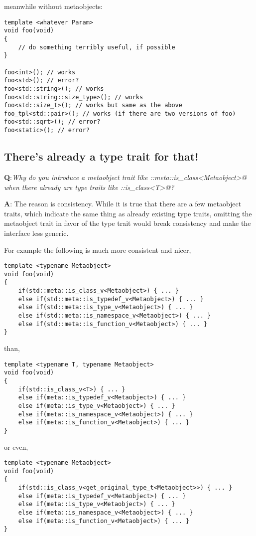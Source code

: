 meanwhile without metaobjects:

\begin{verbatim}
template <whatever Param>
void foo(void)
{
	// do something terribly useful, if possible
}

foo<int>(); // works
foo<std>(); // error?
foo<std::string>(); // works
foo<std::string::size_type>(); // works
foo<std::size_t>(); // works but same as the above
foo_tpl<std::pair>(); // works (if there are two versions of foo)
foo<std::sqrt>(); // error?
foo<static>(); // error?
\end{verbatim}

\subsection{There's already a type trait for that!}

{\textbf Q:}{\em Why do you introduce a metaobject trait like
\verb@std::meta::is_class<Metaobject>@  when there already are type traits like
\verb@std::is_class<T>@?}

{\textbf A:} The reason is consistency.
While it is true that there are a few metaobject traits, which indicate the
same thing as already existing type traits, omitting the metaobject trait
in favor of the type trait would break consistency and make the interface less generic.

For example the following is much more consistent and nicer,

\begin{verbatim}
template <typename Metaobject>
void foo(void)
{
	if(std::meta::is_class_v<Metaobject>) { ... }
	else if(std::meta::is_typedef_v<Metaobject>) { ... }
	else if(std::meta::is_type_v<Metaobject>) { ... }
	else if(std::meta::is_namespace_v<Metaobject>) { ... }
	else if(std::meta::is_function_v<Metaobject>) { ... }
}
\end{verbatim}

than,

\begin{verbatim}
template <typename T, typename Metaobject>
void foo(void)
{
	if(std::is_class_v<T>) { ... }
	else if(meta::is_typedef_v<Metaobject>) { ... }
	else if(meta::is_type_v<Metaobject>) { ... }
	else if(meta::is_namespace_v<Metaobject>) { ... }
	else if(meta::is_function_v<Metaobject>) { ... }
}
\end{verbatim}

or even,

\begin{verbatim}
template <typename Metaobject>
void foo(void)
{
	if(std::is_class_v<get_original_type_t<Metaobject>>) { ... }
	else if(meta::is_typedef_v<Metaobject>) { ... }
	else if(meta::is_type_v<Metaobject>) { ... }
	else if(meta::is_namespace_v<Metaobject>) { ... }
	else if(meta::is_function_v<Metaobject>) { ... }
}
\end{verbatim}

